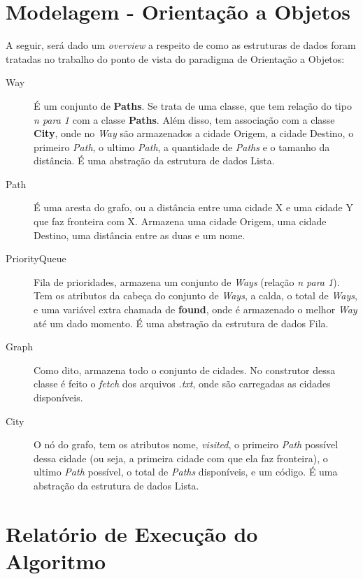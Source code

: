 \section{Modelagem - Orientação a Objetos}
A seguir, será dado um \textit{overview} a respeito de como as estruturas de dados foram tratadas no trabalho do ponto de vista do paradigma de Orientação a Objetos:
\begin{description}
  \item [Way] É um conjunto de \textbf{Paths}. Se trata de uma classe, que tem relação do tipo \textit{n para 1} com a classe \textbf{Paths}. Além disso, tem associação com a classe \textbf{City}, onde no \textit{Way} são armazenados a cidade Origem, a cidade Destino, o primeiro \textit{Path}, o ultimo \textit{Path}, a quantidade de \textit{Paths} e o tamanho da distância. É uma abstração da estrutura de dados Lista.

  \item [Path] É uma aresta do grafo, ou a distância entre uma cidade X e uma cidade Y que faz fronteira com X. Armazena uma cidade Origem, uma cidade Destino, uma distância entre as duas e um nome.

  \item [PriorityQueue] Fila de prioridades, armazena um conjunto de \textit{Ways} (relação \textit{n para 1}). Tem os atributos da cabeça do conjunto de \textit{Ways}, a calda, o total de \textit{Ways}, e uma variável extra chamada de \textbf{found}, onde é armazenado o melhor \textit{Way} até um dado momento. É uma abstração da estrutura de dados Fila.

  \item [Graph] Como dito, armazena todo o conjunto de cidades. No construtor dessa classe é feito o \textit{fetch} dos arquivos \textit{.txt}, onde são carregadas as cidades disponíveis.

  \item [City] O nó do grafo, tem os atributos nome, \textit{visited}, o primeiro \textit{Path} possível dessa cidade (ou seja, a primeira cidade com que ela faz fronteira), o ultimo \textit{Path} possível, o total de \textit{Paths} disponíveis, e um código. É uma abstração da estrutura de dados Lista.
\end{description}

\section{Relatório de Execução do Algoritmo}
